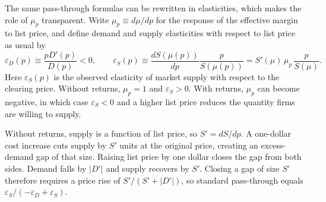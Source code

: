 \documentclass[11pt]{article}
\begin{document}
The same pass-through formulas can be rewritten in elasticities, which makes
the role of $\mu_p$ transparent.  Write $\mu_p\equiv d\mu/dp$ for the response
of the effective margin to list price, and define demand and supply elasticities
with respect to list price as usual by
\[
\varepsilon_D(p)\equiv\frac{p D'(p)}{D(p)}<0,
\qquad
\varepsilon_S(p)\equiv\frac{dS(\mu(p))}{dp}\frac{p}{S(\mu(p))}
=S'(\mu)\,\mu_p\,\frac{p}{S(\mu)}.
\]
Here $\varepsilon_S(p)$ is the observed elasticity of market supply with
respect to the clearing price.  Without returns, $\mu_p=1$ and
$\varepsilon_S>0$.  With returns, $\mu_p$ can become negative, in which case
$\varepsilon_S<0$ and a higher list price reduces the quantity firms are
willing to supply.

Without returns, supply is a function of list price, so $S'=dS/dp$.  A
one-dollar cost increase cuts supply by $S'$ units at the original price,
creating an excess-demand gap of that size.  Raising list price by one dollar
closes the gap from both sides.  Demand falls by $|D'|$ and supply recovers by
$S'$.  Closing a gap of size $S'$ therefore requires a price rise of
$S'/(S'+|D'|)$, so standard pass-through equals
$\varepsilon_S/(-\varepsilon_D+\varepsilon_S)$.
\end{document}
